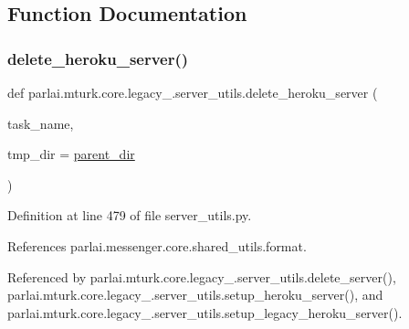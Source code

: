 \subsection{Function Documentation}
\mbox{\label{namespaceparlai_1_1mturk_1_1core_1_1legacy__2018_1_1server__utils_a26ea52356c8ed5c390ea2ad98ccc76f3}} 
\subsubsection{\texorpdfstring{delete\+\_\+heroku\+\_\+server()}{delete\_heroku\_server()}}
{\footnotesize\ttfamily def parlai.\+mturk.\+core.\+legacy\+\_.\+server\+\_\+utils.\+delete\+\_\+heroku\+\_\+server (\begin{DoxyParamCaption}\item[{}]{task\+\_\+name,  }\item[{}]{tmp\+\_\+dir = {\ttfamily \hyperlink{namespaceparlai_1_1mturk_1_1core_1_1legacy__2018_1_1server__utils_a6a871d2f8e5c0768a82ab8fa2e7fadae}{parent\+\_\+dir}} }\end{DoxyParamCaption})}



Definition at line 479 of file server\+\_\+utils.\+py.



References parlai.\+messenger.\+core.\+shared\+\_\+utils.\+format.



Referenced by parlai.\+mturk.\+core.\+legacy\+\_.\+server\+\_\+utils.\+delete\+\_\+server(), parlai.\+mturk.\+core.\+legacy\+\_.\+server\+\_\+utils.\+setup\+\_\+heroku\+\_\+server(), and parlai.\+mturk.\+core.\+legacy\+\_.\+server\+\_\+utils.\+setup\+\_\+legacy\+\_\+heroku\+\_\+server().

